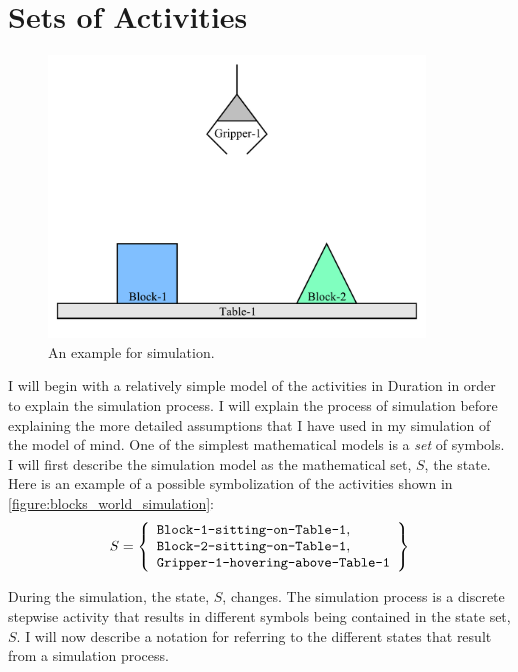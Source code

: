 \section{Sets of Activities}

\begin{figure}[bth]
\includegraphics[width=10cm]{gfx/blocks_world_simulation}
\caption{An example for simulation.}
\label{figure:blocks_world_simulation}
\end{figure}

I will begin with a relatively simple model of the activities in
Duration in order to explain the simulation process.  I will explain
the process of simulation before explaining the more detailed
assumptions that I have used in my simulation of the model of mind.
One of the simplest mathematical models is a \emph{set} of symbols.  I
will first describe the simulation model as the mathematical set, $S$,
the state.  Here is an example of a possible symbolization of the
activities shown in \autoref{figure:blocks_world_simulation}:
\begin{equation}
\label{equation:example_initial_state}
S = \left\{
      \begin{array}{l}
        \text{{\tt Block-1-sitting-on-Table-1}}, \\
        \text{{\tt Block-2-sitting-on-Table-1}}, \\
        \text{{\tt Gripper-1-hovering-above-Table-1}}\\
      \end{array}
    \right\}
\end{equation}

During the simulation, the state, $S$, changes.  The simulation
process is a discrete stepwise activity that results in different
symbols being contained in the state set, $S$.  I will now describe a
notation for referring to the different states that result from a
simulation process.

